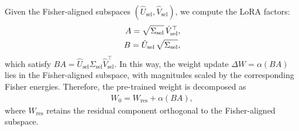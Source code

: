 \documentclass{article}
\theoremstyle{plain}
\theoremstyle{definition}
\theoremstyle{remark}
\begin{document}
Given the Fisher-aligned subspaces $(\hat{U}_{\text{sel}}, \hat{V}_{\text{sel}})$, 
we compute the LoRA factors:
\begin{align}
A = \sqrt{\Sigma_{\text{sel}}}\, \hat{V}_{\text{sel}}^\top, \notag\\
B = \hat{U}_{\text{sel}}\, \sqrt{\Sigma_{\text{sel}}},
\end{align}
which satisfy $BA = \hat{U}_{\text{sel}} \Sigma_{\text{sel}} \hat{V}_{\text{sel}}^\top$. In this way, the weight update $\Delta W = \alpha(BA)$ lies in the Fisher-aligned subspace, with magnitudes scaled by the corresponding Fisher energies.
Therefore, the pre-trained weight is decomposed as
\begin{align}
W_0 = W_{\text{res}} + \alpha(BA), 
\end{align}
where $W_{\text{res}}$ retains the residual component orthogonal to the Fisher-aligned subspace.
\end{document}
